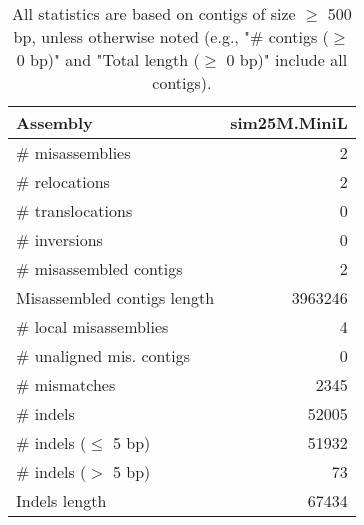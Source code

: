\documentclass[12pt,a4paper]{article}
\begin{document}
\begin{table}[ht]
\begin{center}
\caption{All statistics are based on contigs of size $\geq$ 500 bp, unless otherwise noted (e.g., "\# contigs ($\geq$ 0 bp)" and "Total length ($\geq$ 0 bp)" include all contigs).}
\begin{tabular}{|l*{1}{|r}|}
\hline
Assembly & sim25M.MiniL \\ \hline
\# misassemblies & 2 \\ \hline
\hspace{5mm}\# relocations & 2 \\ \hline
\hspace{5mm}\# translocations & 0 \\ \hline
\hspace{5mm}\# inversions & 0 \\ \hline
\# misassembled contigs & 2 \\ \hline
Misassembled contigs length & 3963246 \\ \hline
\# local misassemblies & 4 \\ \hline
\# unaligned mis. contigs & 0 \\ \hline
\# mismatches & 2345 \\ \hline
\# indels & 52005 \\ \hline
\hspace{5mm}\# indels ($\leq$ 5 bp) & 51932 \\ \hline
\hspace{5mm}\# indels ($>$ 5 bp) & 73 \\ \hline
Indels length & 67434 \\ \hline
\end{tabular}
\end{center}
\end{table}
\end{document}
